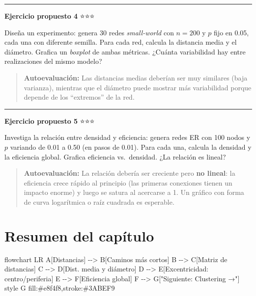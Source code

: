 \documentclass[
  letterpaper,
  DIV=11,
  numbers=noendperiod]{scrreprt}
\newenvironment{Shaded}{\begin{snugshade}}{\end{snugshade}}
\newcommand{\NormalTok}[1]{\textcolor[rgb]{0.00,0.23,0.31}{#1}}
\begin{document}
\begin{center}\rule{0.5\linewidth}{0.5pt}\end{center}

\textbf{Ejercicio propuesto 4} ⭐⭐⭐

Diseña un experimento: genera 30 redes \emph{small-world} con
\(n = 200\) y \(p\) fijo en 0.05, cada una con diferente semilla. Para
cada red, calcula la distancia media y el diámetro. Grafica un
\emph{boxplot} de ambas métricas. ¿Cuánta variabilidad hay entre
realizaciones del mismo modelo?

\begin{quote}
\textbf{Autoevaluación:} Las distancias medias deberían ser muy
similares (baja varianza), mientras que el diámetro puede mostrar más
variabilidad porque depende de los ``extremos'' de la red.
\end{quote}

\begin{center}\rule{0.5\linewidth}{0.5pt}\end{center}

\textbf{Ejercicio propuesto 5} ⭐⭐⭐

Investiga la relación entre densidad y eficiencia: genera redes ER con
100 nodos y \(p\) variando de 0.01 a 0.50 (en pasos de 0.01). Para cada
una, calcula la densidad y la eficiencia global. Grafica eficiencia
vs.~densidad. ¿La relación es lineal?

\begin{quote}
\textbf{Autoevaluación:} La relación debería ser creciente pero
\textbf{no lineal}: la eficiencia crece rápido al principio (las
primeras conexiones tienen un impacto enorme) y luego se satura al
acercarse a 1. Un gráfico con forma de curva logarítmica o raíz cuadrada
es esperable.
\end{quote}

\section{Resumen del capítulo}\label{resumen-del-capuxedtulo-2}

\begin{Shaded}
\begin{Highlighting}[]
\NormalTok{flowchart LR}
\NormalTok{    A[Distancias] {-}{-}\textgreater{} B[Caminos más cortos]}
\NormalTok{    B {-}{-}\textgreater{} C[Matriz de distancias]}
\NormalTok{    C {-}{-}\textgreater{} D[Dist. media y diámetro]}
\NormalTok{    D {-}{-}\textgreater{} E[Excentricidad: centro/periferia]}
\NormalTok{    E {-}{-}\textgreater{} F[Eficiencia global]}
\NormalTok{    F {-}{-}\textgreater{} G["Siguiente: Clustering →"]}
\NormalTok{    style G fill:\#e8f4f8,stroke:\#3ABEF9}
\end{Highlighting}
\end{Shaded}
\end{document}
